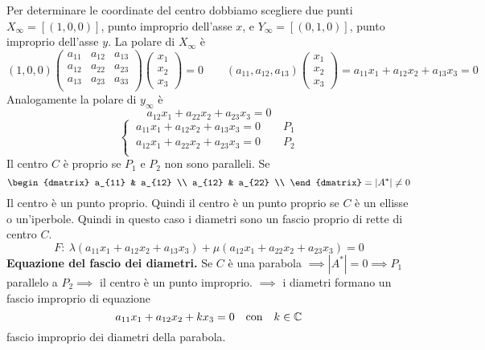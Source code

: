 \documentclass{report}
\begin{document}
Per determinare le coordinate del centro dobbiamo scegliere due punti \(X_{\infty} = [(1, 0, 0)]\), punto improprio dell'asse \(x\), e \(Y_{\infty} = [(0,1,0)]\), punto improprio dell'asse \(y\). La polare di \(X_{\infty}\) è \[
    (1,0,0)
\begin{pmatrix}
    a_{11} & a_{12} & a_{13} \\
    a_{12} & a_{22} & a_{23} \\
    a_{13} & a_{23} & a_{33} \\
\end{pmatrix}
\begin{pmatrix} x_1 \\ x_2\\ x_3 \end{pmatrix} = 0 \qquad (a_{11}, a_{12}, a_{13}) \begin{pmatrix} x_1 \\ x_2\\ x_3 \end{pmatrix} = a_{11}x_1+a_{12}x_2 + a_{13} x_3 = 0
\] Analogamente la polare di \(y_{\infty}\) è  \[
a_{12}x_1 + a_{22}x_2 + a_{23}x_3 = 0
\] \[
\begin{cases}
    \ a_{11}x_1+a_{12}x_2+a_{13}x_3 = 0 \qquad P_1 \\
    \ a_{12}x_1+a_{22}x_2+a_{23}x_3=0 \qquad P_2 \\
\end{cases}
\] 
Il centro \(C\) è proprio se \(P_1\) e \(P_2\) non sono paralleli. Se \[
\begin{dmatrix}
    a_{11} & a_{12} \\
    a_{12} & a_{22} \\
\end{dmatrix} = |A^{*}| \neq 0
\] Il centro è un punto proprio. Quindi il centro è un punto proprio se \(C\) è un ellisse o un'iperbole. Quindi in questo caso i diametri sono un fascio proprio di rette di centro \(C\). \[
F: \ \lambda (a_{11}x_1+a_{12}x_2+a_{13}x_3) + \mu (a_{12}x_1 + a_{22}x_2 + a_{23}x_3) = 0
\] \textbf{Equazione del fascio dei diametri.} Se \(C\) è una parabola \(\implies |A^{*}| = 0 \implies P_1 \) parallelo a \(P_2 \implies  \) il centro è un punto improprio. \(\implies \) i diametri formano un fascio improprio di equazione \[
a_{11}x_1+a_{12}x_2 + kx_3 = 0 \quad \text{con} \quad k \in \CC
\] fascio improprio dei diametri della parabola.
\end{document}
